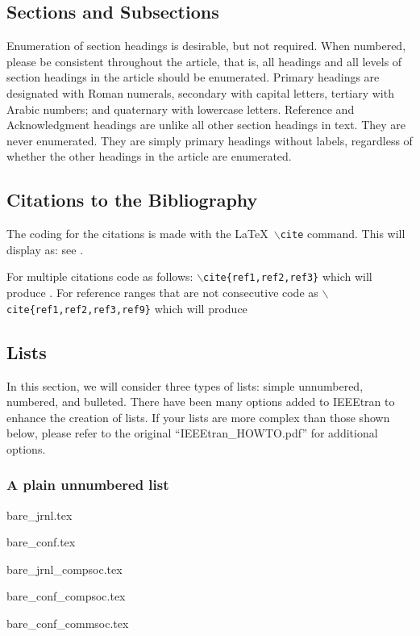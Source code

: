 \documentclass[journal,9pt]{IEEEtran}
\begin{document}
\subsection{Sections and Subsections}
Enumeration of section headings is desirable, but not required. When numbered, please be consistent throughout the article, that is, all headings and all levels of section headings in the article should be enumerated. Primary headings are designated with Roman numerals, secondary with capital letters, tertiary with Arabic numbers; and quaternary with lowercase letters. Reference and Acknowledgment headings are unlike all other section headings in text. They are never enumerated. They are simply primary headings without labels, regardless of whether the other headings in the article are enumerated.

\subsection{Citations to the Bibliography}
The coding for the citations is made with the \LaTeX\ $\backslash${\tt{cite}} command.
This will display as: see \cite{ref1}.

For multiple citations code as follows: {\tt{$\backslash$cite\{ref1,ref2,ref3\}}}
which will produce \cite{ref1,ref2,ref3}. For reference ranges that are not consecutive code as {\tt{$\backslash$cite\{ref1,ref2,ref3,ref9\}}} which will produce  \cite{ref1,ref2,ref3,ref9}

\subsection{Lists}
In this section, we will consider three types of lists: simple unnumbered, numbered, and bulleted. There have been many options added to IEEEtran to enhance the creation of lists. If your lists are more complex than those shown below, please refer to the original ``IEEEtran\_HOWTO.pdf'' for additional options.

\subsubsection*{\bf A plain  unnumbered list}
\begin{list}{}{}
  \item{bare\_jrnl.tex}
  \item{bare\_conf.tex}
  \item{bare\_jrnl\_compsoc.tex}
  \item{bare\_conf\_compsoc.tex}
  \item{bare\_conf\_commsoc.tex}
\end{list}
\end{document}
